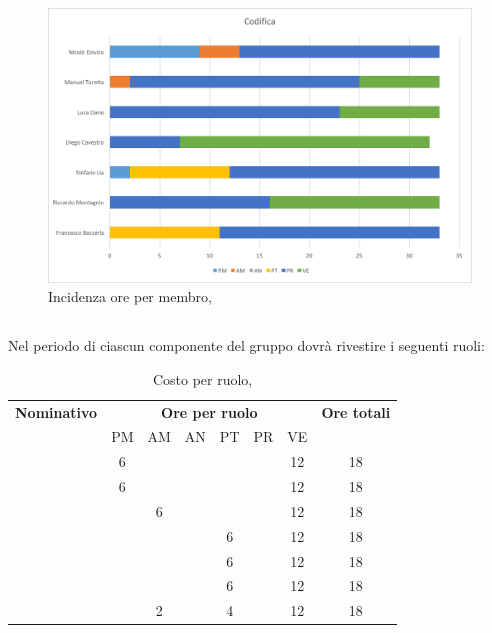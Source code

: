 \begin{figure}[H]
	\centering 
	\includegraphics[scale=0.7]{Immagini/GraficiPianoLavoro/COD.png}
	\caption{Incidenza ore per membro, \COD}
\end{figure}

\newpage
\subsection{\VV}
Nel periodo di \VV{} ciascun componente del gruppo dovrà rivestire i seguenti ruoli:

\begin{table}[h]
	\begin{center}
		\begin{tabular}{|c|c|c|c|c|c|c|c|}
			\hline
			\textbf{Nominativo} & \multicolumn{6}{c|}{\textbf{Ore per ruolo}} & \textbf{Ore totali} \\
					& PM & AM & AN & PT & PR & VE & \\
			\hline
			\FB		& 6  &	  &	   &	&	 & 12 &	18	\\
			\hline
			\RM		& 6	 &	  &	   &	&	 & 12 & 18	\\
			\hline
			\SL		&	 & 6  &	   &	&	 & 12 &	18	\\
			\hline
			\DC		&	 &	  &	   & 6  &	 & 12 &	18	\\
			\hline
			\LD 	&	 &	  &	   & 6	&	 & 12 &	18	\\
			\hline
			\MT		& 	 &	  &	   & 6	&	 & 12 &	18	\\
			\hline
			\ND 	&	 & 2  &	   & 4	&	 & 12 & 18	\\
			\hline
		\end{tabular}
	\end{center}
	\caption{Costo per ruolo, \VV}
\end{table}

